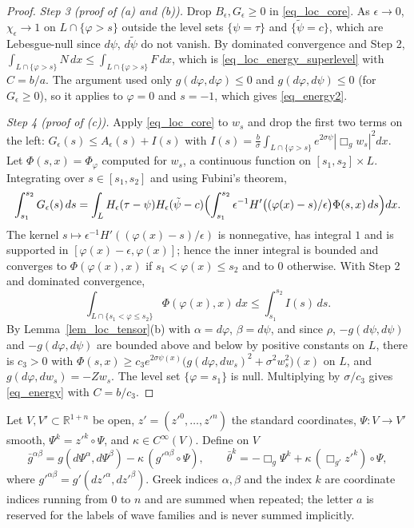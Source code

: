 \documentclass[11pt,a4paper,reqno]{amsart}
\theoremstyle{definition}
\numberwithin{equation}{section}
\newcommand{\R}{\mathbb{R}}
\newcommand{\bg}{\bar g}
\newcommand{\bth}{\bar\theta}
\begin{document}
\begin{proof}
\emph{Step 3 (proof of (a) and (b)).} Drop $B_\epsilon,G_\epsilon\ge0$ in \eqref{eq_loc_core}. As $\epsilon\to0$, $\chi_\epsilon\to1$
on $L\cap\{\varphi>s\}$ outside the level sets $\{\psi=\tau\}$ and $\{\tilde\psi=c\}$, which are Lebesgue-null since $d\psi$,
$d\tilde\psi$ do not vanish. By dominated convergence and Step 2, $\int_{L\cap\{\varphi>s\}}N\,dx\le\int_{L\cap\{\varphi>s\}}F\,dx$,
which is \eqref{eq_loc_energy_superlevel} with $C=b/a$. The argument used only $g(d\varphi,d\varphi)\le0$ and
$g(d\varphi,d\psi)\le0$ (for $G_\epsilon\ge0$), so it applies to $\varphi=0$ and $s=-1$, which gives \eqref{eq_energy2}.

\emph{Step 4 (proof of (c)).} Apply \eqref{eq_loc_core} to $w_s$ and drop the first two terms on the left:
$G_\epsilon(s)\le A_\epsilon(s)+I(s)$ with $I(s)=\frac b\sigma\int_{L\cap\{\varphi>s\}}e^{2\sigma\psi}|\Box_gw_s|^2dx$. Let
$\Phi(s,x)=\Phi_\varphi$ computed for $w_s$, a continuous function on $[s_1,s_2]\times L$. Integrating over $s\in[s_1,s_2]$ and
using Fubini's theorem,
\[
\int_{s_1}^{s_2}G_\epsilon(s)\,ds=\int_LH_\epsilon(\tau-\psi)H_\epsilon(\tilde\psi-c)\Bigl(\int_{s_1}^{s_2}\epsilon^{-1}H'\bigl((\varphi(x)-s)/\epsilon\bigr)\Phi(s,x)\,ds\Bigr)dx .
\]
The kernel $s\mapsto\epsilon^{-1}H'((\varphi(x)-s)/\epsilon)$ is nonnegative, has integral $1$ and is supported in
$[\varphi(x)-\epsilon,\varphi(x)]$; hence the inner integral is bounded and converges to $\Phi(\varphi(x),x)$ if
$s_1<\varphi(x)\le s_2$ and to $0$ otherwise. With Step 2 and dominated convergence,
\[
\int_{L\cap\{s_1<\varphi\le s_2\}}\Phi(\varphi(x),x)\,dx\le\int_{s_1}^{s_2}I(s)\,ds .
\]
By Lemma~\ref{lem_loc_tensor}(b) with $\alpha=d\varphi$, $\beta=d\psi$, and since $\rho$, $-g(d\psi,d\psi)$ and
$-g(d\varphi,d\psi)$ are bounded above and below by positive constants on $L$, there is $c_3>0$ with
$\Phi(s,x)\ge c_3e^{2\sigma\psi(x)}\bigl(g(d\varphi,dw_s)^2+\sigma^2w_s^2\bigr)(x)$ on $L$, and $g(d\varphi,dw_s)=-Zw_s$. The
level set $\{\varphi=s_1\}$ is null. Multiplying by $\sigma/c_3$ gives \eqref{eq_energy} with $C=b/c_3$.
\end{proof}

Let $V,V'\subset\R^{1+n}$ be open, $z'=(z'^0,\dots,z'^n)$ the standard coordinates, $\Psi\colon V\to V'$ smooth,
$\Psi^k=z'^k\circ\Psi$, and $\kappa\in C^\infty(V)$. Define on $V$
\begin{equation}\label{eq_bars}
\bg^{\alpha\beta}=g(d\Psi^\alpha,d\Psi^\beta)-\kappa\,(g'^{\alpha\beta}\circ\Psi),\qquad \bth^k=-\Box_g\Psi^k+\kappa\,(\Box_{g'}z'^k)\circ\Psi,
\end{equation}
where $g'^{\alpha\beta}=g'(dz'^\alpha,dz'^\beta)$. Greek indices $\alpha,\beta$ and the index $k$ are coordinate indices
running from $0$ to $n$ and are summed when repeated; the letter $a$ is reserved for the labels of wave families and is
never summed implicitly.
\end{document}
